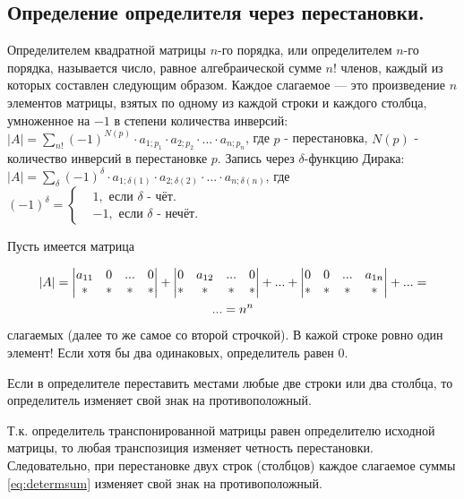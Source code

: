 \documentclass[a4paper,14pt]{article}
\begin{document}
\subsection{Определение определителя через перестановки.}
Определителем квадратной матрицы $n$-го порядка, или определителем $n$-го порядка, называется число, равное алгебраической сумме $n!$ членов, каждый из которых составлен следующим образом. Каждое слагаемое — это произведение $n$ элементов матрицы, взятых по одному из каждой строки и каждого столбца, умноженное на $-1$ в степени количества инверсий: $|A|=\sum\limits_{n!}(-1)^{N(p)} \cdot a_{1;p_1} \cdot a_{2;p_2} \cdot ... \cdot a_{n;p_n}$, где $p$ - перестановка, $N(p)$ - количество инверсий в перестановке $p$.
Запись через $\delta$-функцию Дирака: $|A| = \sum_{\delta}(-1)^{\delta} \cdot a_{1;\delta(1)} \cdot a_{2;\delta(2)} \cdot ... \cdot a_{n;\delta(n)}$, где $(-1)^{\delta}=\begin{cases}&1, \text{ если } \delta \text{ - чёт.} \\ &-1, \text{ если } \delta \text{ - нечёт.}\end{cases}$
\begin{evidence}
	Пусть имеется матрица
	
	\begin{multline}\label{eq:determsum}
	|A|=\begin{vmatrix}a_{11} & 0 & ... & 0 \\ * & * & * & *\end{vmatrix} + \begin{vmatrix}0 & a_{12} & ... & 0 \\ * & * & * & *\end{vmatrix} + ... + \begin{vmatrix}0 & 0 & ... & a_{1n} \\ * & * & * & *\end{vmatrix} + ... \hm{=} \\ ... = n^n
	\end{multline} слагаемых (далее то же самое со второй строчкой). В кажой строке ровно один элемент! Если хотя бы два одинаковых, определитель равен 0.
\end{evidence}
\begin{property}
	Если в определителе переставить местами любые две строки или два столбца, то определитель изменяет свой знак на противоположный.
	\begin{evidence}
		Т.к. определитель транспонированной матрицы равен определителю исходной матрицы, то любая транспозиция изменяет четность перестановки. Следовательно, при перестановке двух строк (столбцов) каждое слагаемое суммы \eqref{eq:determsum} изменяет свой знак на противоположный.
	\end{evidence}
\end{property}
\end{document}
